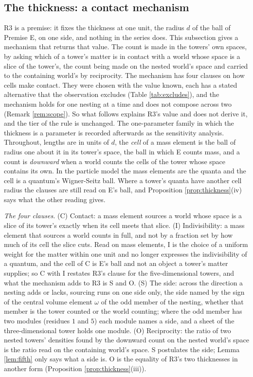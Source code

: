 \documentclass[11pt]{article}
\theoremstyle{definition}
\begin{document}
\subsection{The thickness: a contact mechanism}\label{subsec:free}

R3 is a premise: it fixes the thickness at one unit, the radius $d$ of the ball of Premise E, on one side, and nothing in the series does. This subsection gives a mechanism that returns that value. The count is made in the towers' own spaces, by asking which of a tower's matter is in contact with a world whose space is a slice of the tower's, the count being made on the nested world's space and carried to the containing world's by reciprocity. The mechanism has four clauses on how cells make contact. They were chosen with the value known, each has a stated alternative that the observation excludes (Table \ref{tab:excludes}), and the mechanism holds for one nesting at a time and does not compose across two (Remark \ref{rem:scope}). So what follows explains R3's value and does not derive it, and the tier of the rule is unchanged. The one-parameter family in which the thickness is a parameter is recorded afterwards as the sensitivity analysis. Throughout, lengths are in units of $d$, the \emph{cell} of a mass element is the ball of radius one about it in its tower's space, the ball in which E counts mass, and a count is \emph{downward} when a world counts the cells of the tower whose space contains its own. In the particle model the mass elements are the quanta and the cell is a quantum's Wigner-Seitz ball. Where a tower's quanta have another cell radius the clauses are still read on E's ball, and Proposition \ref{prop:thickness}(iv) says what the other reading gives.

\emph{The four clauses.} (C) Contact: a mass element sources a world whose space is a slice of its tower's exactly when its cell meets that slice. (I) Indivisibility: a mass element that sources a world counts in full, and not by a fraction set by how much of its cell the slice cuts. Read on mass elements, I is the choice of a uniform weight for the matter within one unit and no longer expresses the indivisibility of a quantum, and the cell of C is E's ball and not an object a tower's matter supplies; so C with I restates R3's clause for the five-dimensional towers, and what the mechanism adds to R3 is S and O. (S) The side: across the direction a nesting adds or lacks, sourcing runs on one side only, the side named by the sign of the central volume element $\omega$ of the odd member of the nesting, whether that member is the tower counted or the world counting; where the odd member has two modules (residues $1$ and $5$) each module names a side, and a sheet of the three-dimensional tower holds one module. (O) Reciprocity: the ratio of two nested towers' densities found by the downward count on the nested world's space is the ratio read on the containing world's space. S postulates the side; Lemma \ref{lem:fifth} only says what a side is. O is the equality of R3's two thicknesses in another form (Proposition \ref{prop:thickness}(iii)).
\end{document}
